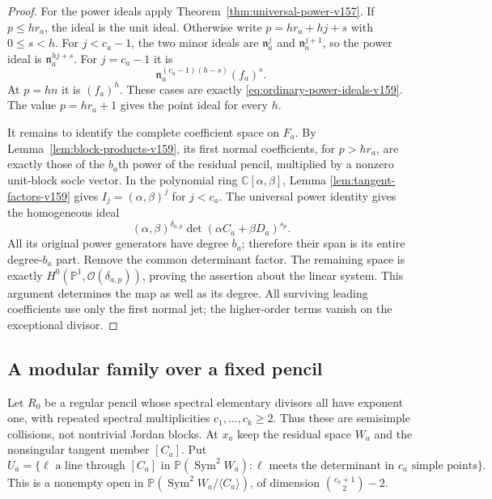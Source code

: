 \documentclass[11pt,reqno]{amsart}
\numberwithin{equation}{section}
\theoremstyle{definition}\newtheorem{definition}[theorem]{Definition}
\theoremstyle{remark}\newtheorem{remark}[theorem]{Remark}
\newcommand{\C}{\mathbb C}\newcommand{\Q}{\mathbb Q}
\newcommand{\Pj}{\mathbb P}\newcommand{\A}{\mathbb A}
\newcommand{\OO}{\mathcal O}\newcommand{\II}{\mathcal I}
\DeclareMathOperator{\Sym}{Sym}\DeclareMathOperator{\Gr}{Gr}
\begin{document}
\begin{proof}
For the power ideals apply Theorem~\ref{thm:universal-power-v157}.
If $p\leq hr_a$, the ideal is the unit ideal. Otherwise write
$p=hr_a+hj+s$ with $0\leq s<h$. For $j<c_a-1$, the two minor
ideals are $\mathfrak n_a^j$ and $\mathfrak n_a^{j+1}$, so the
power ideal is $\mathfrak n_a^{hj+s}$. For $j=c_a-1$ it is
\[
        \mathfrak n_a^{(c_a-1)(h-s)}(f_a)^s.
\]
At $p=hn$ it is $(f_a)^h$. These cases are exactly
\eqref{eq:ordinary-power-ideals-v159}. The value $p=hr_a+1$ gives
the point ideal for every $h$.

It remains to identify the complete coefficient space on $F_a$.
By Lemma~\ref{lem:block-products-v159}, its first normal coefficients,
for $p>hr_a$, are exactly those of the $b_a$th power of the residual
pencil, multiplied by a nonzero unit-block socle vector. In the
polynomial ring $\C[\alpha,\beta]$, Lemma
\ref{lem:tangent-factors-v159} gives $I_j=(\alpha,\beta)^j$ for
$j<c_a$. The universal power identity gives the homogeneous ideal
\[
 (\alpha,\beta)^{\delta_{a,p}}
                    \det(\alpha C_a+\beta D_a)^{s_p}.
\]
All its original power generators have degree $b_a$; therefore their
span is its entire degree-$b_a$ part. Remove the common determinant
factor. The remaining space is exactly
$H^0(\Pj^1,\OO(\delta_{a,p}))$, proving the assertion about the
linear system. This argument determines the map as well as its degree.
All surviving leading coefficients use only the first normal jet;
the higher-order terms vanish on the exceptional divisor.
\end{proof}

\subsection{A modular family over a fixed pencil}
Let $R_0$ be a regular pencil whose spectral elementary divisors all
have exponent one, with repeated spectral multiplicities
$c_1,\ldots,c_k\geq2$. Thus these are semisimple collisions, not
nontrivial Jordan blocks. At $x_a$ keep the residual space $W_a$ and
the nonsingular tangent member $[C_a]$. Put
\begin{equation}\label{eq:residual-parameter-v159}
 U_a=\{\ell\text{ a line through }[C_a]\text{ in }\Pj(\Sym^2W_a):
             \ell\text{ meets the determinant in }c_a\text{ simple points}\}.
\end{equation}
This is a nonempty open in
$\Pj(\Sym^2W_a/\langle C_a\rangle)$, of dimension
$\binom{c_a+1}{2}-2$.
\end{document}
